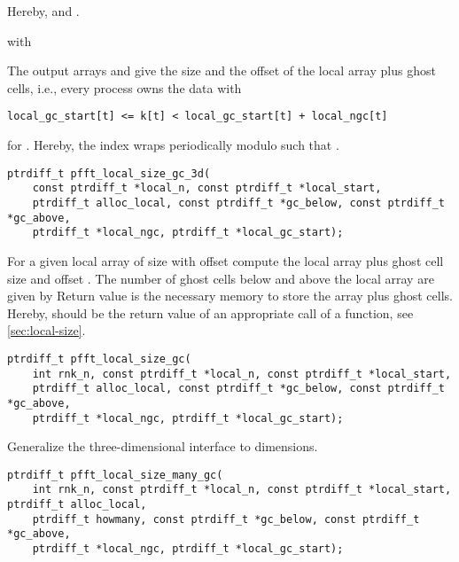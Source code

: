 Hereby,  and .

 with 

The output arrays  and  give the size and the offset of the local array plus ghost cells, i.e.,
every process owns the data  with
\begin{lstlisting}
local_gc_start[t] <= k[t] < local_gc_start[t] + local_ngc[t]
\end{lstlisting}
for .
Hereby, the index  wraps periodically modulo  such that .

\begin{lstlisting}
ptrdiff_t pfft_local_size_gc_3d(
    const ptrdiff_t *local_n, const ptrdiff_t *local_start,
    ptrdiff_t alloc_local, const ptrdiff_t *gc_below, const ptrdiff_t *gc_above,
    ptrdiff_t *local_ngc, ptrdiff_t *local_gc_start);
\end{lstlisting}
For a given local array of size  with offset  compute the
local array plus ghost cell size  and offset .
The number of ghost cells below and above the local array are given by
Return value is the necessary memory to store the array plus ghost cells.
Hereby,  should be the return value of an appropriate
call of a  function, see \ref{sec:local-size}.

\begin{lstlisting}
ptrdiff_t pfft_local_size_gc(
    int rnk_n, const ptrdiff_t *local_n, const ptrdiff_t *local_start,
    ptrdiff_t alloc_local, const ptrdiff_t *gc_below, const ptrdiff_t *gc_above,
    ptrdiff_t *local_ngc, ptrdiff_t *local_gc_start);
\end{lstlisting}
Generalize the three-dimensional interface to  dimensions.
\begin{lstlisting}
ptrdiff_t pfft_local_size_many_gc(
    int rnk_n, const ptrdiff_t *local_n, const ptrdiff_t *local_start, ptrdiff_t alloc_local,
    ptrdiff_t howmany, const ptrdiff_t *gc_below, const ptrdiff_t *gc_above,
    ptrdiff_t *local_ngc, ptrdiff_t *local_gc_start);
\end{lstlisting}

